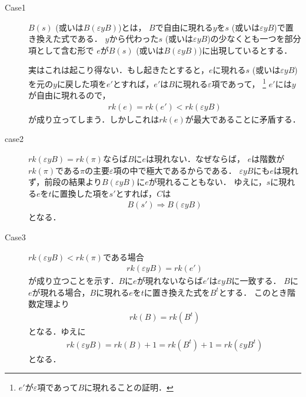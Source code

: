 	\begin{metaprf}\mbox{}
		\begin{description}
			\item[Case1]
				$B(s)$ (或いは$B(\varepsilon y B)$)とは，
				$B$で自由に現れる$y$を$s$ (或いは$\varepsilon y B$)で置き換えた式である．
				$y$から代わった$s$ (或いは$\varepsilon y B$)の少なくとも一つを部分項として含む形で
				$e$が$B(s)$ (或いは$B(\varepsilon y B)$)に出現しているとする．
				
				実はこれは起こり得ない．もし起きたとすると，$e$に現れる$s$ (或いは$\varepsilon y B$)
				を元の$y$に戻した項を$e'$とすれば，$e'$は$B$に現れる$\varepsilon$項であって，
				\footnote{
					$e'$が$\varepsilon$項であって$B$に現れることの証明．
				}
				$e'$には$y$が自由に現れるので，
				\begin{align}
					rk(e) = rk(e') < rk(\varepsilon y B)
				\end{align}
				が成り立ってしまう．しかしこれは$rk(e)$が最大であることに矛盾する．
				
			\item[case2] $rk(\varepsilon y B) = rk(\pi)$ならば$B$に$e$は現れない．なぜならば，
				$e$は階数が$rk(\pi)$である$\pi$の主要$\varepsilon$項の中で極大であるからである．
				$\varepsilon y B$にも$e$は現れず，前段の結果より$B(\varepsilon y B)$に$e$が現れることもない．
				ゆえに，$s$に現れる$e$を$t$に置換した項を$s'$とすれば，$C$は
				\begin{align}
					B(s') \Longrightarrow B(\varepsilon y B)
				\end{align}
				となる．
			
			\item[Case3]
				$rk(\varepsilon y B) < rk(\pi)$である場合
				\begin{align}
					rk(\varepsilon y B) = rk(e')
				\end{align}
				が成り立つことを示す．$B$に$e$が現れないならば$e'$は$\varepsilon y B$に一致する．
				$B$に$e$が現れる場合，$B$に現れる$e$を$t$に置き換えた式を$B^{t}$とする．
				このとき階数定理より
				\begin{align}
					rk(B) = rk(B^{t})
				\end{align}
				となる．ゆえに
				\begin{align}
					rk(\varepsilon y B) = rk(B) + 1 = rk(B^{t}) + 1 = rk(\varepsilon y B^{t})
				\end{align}
				となる．
				\QED
		\end{description}
	\end{metaprf}
	
